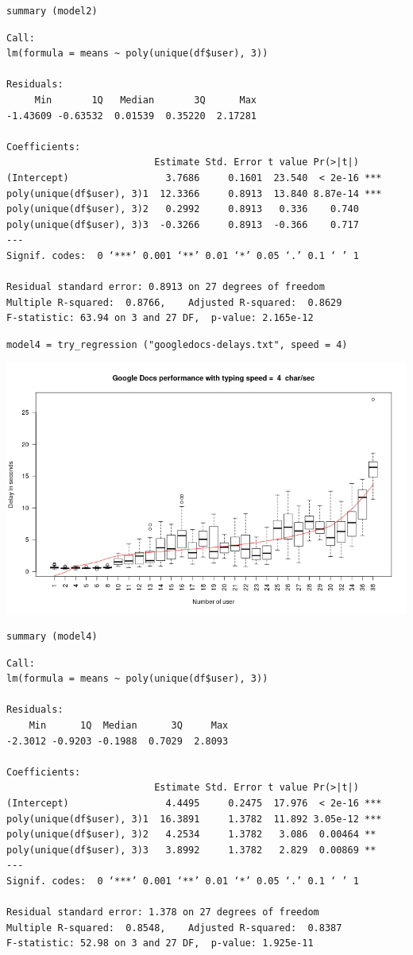 \documentclass[10pt]{article}
\begin{document}
\begin{verbatim}
summary (model2)
\end{verbatim}

\begin{verbatim}
Call:
lm(formula = means ~ poly(unique(df$user), 3))

Residuals:
     Min       1Q   Median       3Q      Max 
-1.43609 -0.63532  0.01539  0.35220  2.17281 

Coefficients:
                          Estimate Std. Error t value Pr(>|t|)    
(Intercept)                 3.7686     0.1601  23.540  < 2e-16 ***
poly(unique(df$user), 3)1  12.3366     0.8913  13.840 8.87e-14 ***
poly(unique(df$user), 3)2   0.2992     0.8913   0.336    0.740    
poly(unique(df$user), 3)3  -0.3266     0.8913  -0.366    0.717    
---
Signif. codes:  0 ‘***’ 0.001 ‘**’ 0.01 ‘*’ 0.05 ‘.’ 0.1 ‘ ’ 1

Residual standard error: 0.8913 on 27 degrees of freedom
Multiple R-squared:  0.8766,	Adjusted R-squared:  0.8629 
F-statistic: 63.94 on 3 and 27 DF,  p-value: 2.165e-12
\end{verbatim}

\begin{verbatim}
model4 = try_regression ("googledocs-delays.txt", speed = 4)
\end{verbatim}

\includegraphics[width=.9\linewidth]{figs/g4.png}

\begin{verbatim}
summary (model4)
\end{verbatim}

\begin{verbatim}
Call:
lm(formula = means ~ poly(unique(df$user), 3))

Residuals:
    Min      1Q  Median      3Q     Max 
-2.3012 -0.9203 -0.1988  0.7029  2.8093 

Coefficients:
                          Estimate Std. Error t value Pr(>|t|)    
(Intercept)                 4.4495     0.2475  17.976  < 2e-16 ***
poly(unique(df$user), 3)1  16.3891     1.3782  11.892 3.05e-12 ***
poly(unique(df$user), 3)2   4.2534     1.3782   3.086  0.00464 ** 
poly(unique(df$user), 3)3   3.8992     1.3782   2.829  0.00869 ** 
---
Signif. codes:  0 ‘***’ 0.001 ‘**’ 0.01 ‘*’ 0.05 ‘.’ 0.1 ‘ ’ 1

Residual standard error: 1.378 on 27 degrees of freedom
Multiple R-squared:  0.8548,	Adjusted R-squared:  0.8387 
F-statistic: 52.98 on 3 and 27 DF,  p-value: 1.925e-11
\end{verbatim}
\end{document}
